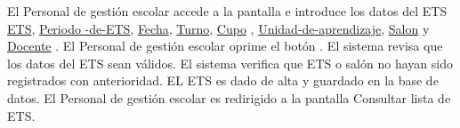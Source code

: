      \begin{UCtrayectoria}
     
         \UCpaso[\UCactor] El Personal de gestión escolar accede a la pantalla \label{CU29.introduceDatos} e introduce los datos del ETS {\hyperlink{ETS.ETS }{ETS},  \hyperlink{ETS.Periodo -de-ETS }{ Periodo -de-ETS},  \hyperlink{ETS.Fecha}{Fecha},  \hyperlink{ETS.Turno}{Turno},  \hyperlink{ETS.Cupo} {Cupo} ,  \hyperlink{ETS.Unidad-de-aprendizaje }{Unidad-de-aprendizaje},  \hyperlink{ETS.Salon}{Salon} y \hyperlink{ETS.Docente}{Docente} .
         \UCpaso[\UCactor] El Personal de gestión escolar oprime el botón .
         \UCpaso El sistema revisa que los datos del ETS sean válidos.
         \UCpaso El sistema verifica que ETS o salón no hayan sido registrados con anterioridad.
         \UCpaso EL ETS es dado de alta y guardado en la base de datos.
         \UCpaso[\UCactor] El Personal de gestión escolar es redirigido a la pantalla  Consultar lista de ETS}.
     
     \end{UCtrayectoria}
     
    